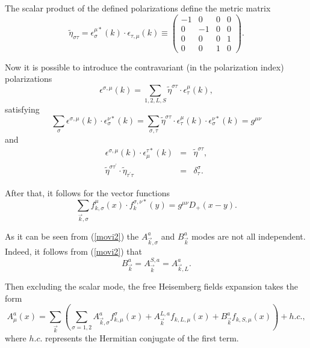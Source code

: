 \documentclass[12pt,letterpaper]{report}
\begin{document}
The scalar product of the defined polarizations define the metric
matrix
\[
\widetilde{\eta }_{\sigma \tau }=\epsilon _\sigma ^{\mu
*}\left(k\right) \cdot \epsilon _{\tau,\mu }\left(k\right)\equiv
\left(
\begin{array}{cccc}
-1 & 0 & 0 & 0 \\
0 & -1 & 0 & 0 \\
0 & 0 & 0 & 1 \\
0 & 0 & 1 & 0
\end{array}
\right).
\]

Now it is possible to introduce the contravariant (in the
polarization index) polarizations
\[
\epsilon ^{\sigma,\mu }\left(k\right)
=\sum\limits_{1,2,L,S}\widetilde{ \eta }^{\sigma \tau }\cdot
\epsilon _\tau ^\mu \left(k\right),
\]
satisfying
\[
\sum\limits_\sigma \epsilon ^{\sigma,\mu }\left(k\right) \cdot
\epsilon _\sigma ^{\nu *}\left(k\right) =\sum\limits_{\sigma,\tau
}\widetilde{\eta } ^{\sigma \tau }\cdot \epsilon _\tau ^\mu \left(
k\right) \cdot \epsilon _\sigma ^{\nu *}\left(k\right) =g^{\mu \nu
}
\]
and
\begin{eqnarray*}
\epsilon ^{\sigma,\mu }\left(k\right) \cdot \epsilon _\mu ^{\tau
*}\left(k\right) &=&\widetilde{\eta }^{\sigma \tau }, \\
\widetilde{\eta }^{\sigma \tau ^{\prime }}\cdot \widetilde{\eta
}_{\tau ^{\prime }\tau } &=&\delta _\tau ^\sigma.
\end{eqnarray*}

After that, it follows for the vector functions
\[
\sum\limits_{\vec{k},\sigma }f_{k,\sigma }^\mu \left(x\right)
\cdot f_k^{\sigma,\nu *}\left(y\right) =g^{\mu \nu }D_{+}\left(
x-y\right).
\]

As it can be seen from (\ref{movi2}) the $A_{\vec{k},\sigma }^a$
and $B_{\vec{k}}^a$ modes are not all independent. Indeed, it
follows from (\ref {movi2}) that
\[
B_{\vec{k}}^a=A_{\vec{k}}^{S,a}=A_{\vec{k},L}^a.
\]

Then excluding the scalar mode, the free Heisemberg fields
expansion takes the form
\begin{equation}
A_\mu ^a\left(x\right) =\sum\limits_{\vec{k}}\left(
\sum\limits_{\sigma =1,2}A_{\vec{k},\sigma }^af_{k,\mu }^\sigma
\left(x\right) +A_{\vec{k} }^{L,a}f_{k,L,\mu }\left(x\right)
+B_{\vec{k}}^af_{k,S,\mu }\left(x\right) \right)+h.c.,
\end{equation}
where $h.c.$ represents the Hermitian conjugate of the first term.

\newpage
\end{document}
